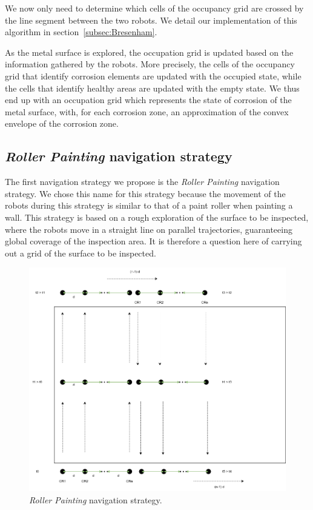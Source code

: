 We now only need to determine which cells of the occupancy grid are crossed by the line segment between the two robots.
We detail our implementation of this algorithm in section~\ref{subsec:Bresenham}.

As the metal surface is explored, the occupation grid is updated based on the information gathered by the robots.
More precisely, the cells of the occupancy grid that identify corrosion elements are updated with the occupied state, while the cells that identify healthy areas are updated with the empty state.
We thus end up with an occupation grid which represents the state of corrosion of the metal surface, with, for each corrosion zone, an approximation of the convex envelope of the corrosion zone.

\subsection*{\textit{Roller Painting} navigation strategy}

The first navigation strategy we propose is the \textit{Roller Painting} navigation strategy.
We chose this name for this strategy because the movement of the robots during this strategy is similar to that of a paint roller when painting a wall.
This strategy is based on a rough exploration of the surface to be inspected, where the robots move in a straight line on parallel trajectories, guaranteeing global coverage of the inspection area.
It is therefore a question here of carrying out a grid of the surface to be inspected.

\begin{figure}[h!]
	\centering
	\includegraphics[scale=0.5]{graphics/peinture_au_rouleau.png}
	\caption{\textit{Roller Painting} navigation strategy.}
	\label{fig:peinture_au_rouleau}
\end{figure}

